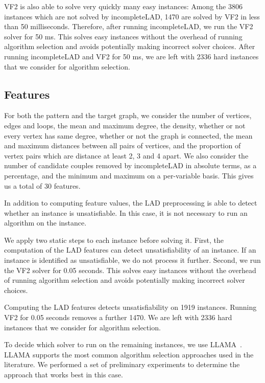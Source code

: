 \documentclass{llncs}
\begin{document}
VF2 is also able to solve very quickly many easy instances: Among the 3806 instances which are not solved by incompleteLAD, 1470 are solved by VF2 in less than 50 milliseconds. Therefore, after running incompleteLAD, we run the VF2 solver for 50 ms. This solves easy instances without the overhead of running algorithm selection and avoids potentially making incorrect solver choices. After running incompleteLAD and VF2 for 50 ms, we are left with 2336 hard instances that we consider for algorithm selection.




\subsection{Features}

For both the pattern and the target graph, we consider the number of vertices,
edges and loops, the mean and maximum degree, the density, whether or not every
vertex has same degree, whether or not the graph is connected, the mean and
maximum distances between all pairs of vertices, and the proportion of vertex
pairs which are distance at least 2, 3 and 4 apart. We also consider the number
of candidate couples removed by incompleteLAD in absolute terms, as
a percentage, and the minimum and maximum on a per-variable basis. This gives
us a total of 30 features.

In addition to computing feature values, the LAD preprocessing is able to detect
whether an instance is unsatisfiable. In this case, it is not necessary to run
an algorithm on the instance.


We apply two static steps to each instance before solving it. First, the
computation of the LAD features can detect unsatisfiability of an instance. If
an instance is identified as unsatisfiable, we do not process it further.
Second, we run the VF2 solver for 0.05 seconds. This solves easy instances
without the overhead of running algorithm selection and avoids potentially
making incorrect solver choices.

Computing the LAD features detects unsatisfiability on 1919 instances. Running
VF2 for 0.05 seconds removes a further 1470. We are left with 2336 hard
instances that we consider for algorithm selection.

To decide which solver to run on the remaining instances, we use
LLAMA~\cite{kotthoff_llama_2013}. LLAMA supports the most common algorithm
selection approaches used in the literature. We performed a set of preliminary
experiments to determine the approach that works best in this case.
\end{document}
